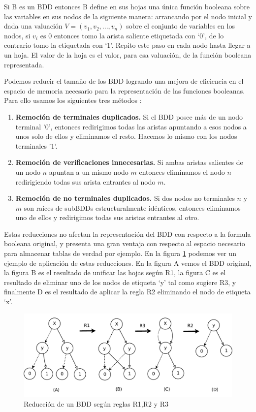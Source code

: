\documentclass[titlepage, 12pt]{book}
\begin{document}
Si B es un BDD entonces B define en sus hojas una \'unica funci\'on booleana sobre las variables en sus nodos de la siguiente manera: arrancando por el nodo inicial y dada una valuaci\'on $V=(v_1,v_2,...,v_n)$ sobre el conjunto de variables en los nodos, si $v_i$ es $0$ entonces tomo la arista saliente etiquetada con `0', de lo contrario tomo la etiquetada con `1'. Repito este paso en cada nodo hasta llegar a un hoja. El valor de la hoja es el valor, para esa valuaci\'on, de la funci\'on booleana representada.

Podemos reducir el tama\~no de los BDD logrando una mejora de eficiencia en el espacio de memoria necesario para la representaci\'on de las funciones booleanas. Para ello usamos los siguientes tres m\'etodos \cite{Huth}:
\begin{enumerate}[R1--]
\item \textbf{Remoci\'on de terminales duplicados.} Si el BDD posee m\'as de un nodo terminal '0', entonces redirigimos todas las aristas apuntando a esos nodos a unos solo de ellos y eliminamos el resto. Hacemos lo mismo con los nodos terminales '1'.
\item \textbf{Remoci\'on de verificaciones innecesarias.} Si ambas aristas salientes de un nodo $n$ apuntan a un mismo nodo $m$ entonces eliminamos el nodo $n$ redirigiendo todas sus arista entrantes al nodo $m$.
\item \textbf{Remoci\'on de no terminales duplicados.} Si dos nodos no terminales $n$ y $m$ son ra\'ices de subBDDs estructuralmente id\'enticos, entonces eliminamos uno de ellos y redirigimos todas sus aristas entrantes al otro.
\end{enumerate}
Estas reducciones no afectan la representaci\'on del BDD con respecto a la formula booleana original, y presenta una gran ventaja con respecto al espacio necesario para almacenar tablas de verdad por ejemplo. En la figura \ref{reduccionBDD} podemos ver un ejemplo de aplicaci\'on de estas reducciones. En la figura A vemos el BDD original, la figura B es el resultado de unificar las hojas seg\'un R1, la figura C es el resultado de eliminar uno de los nodos de etiqueta `y' tal como sugiere R3, y finalmente D es el resultado de aplicar la regla R2 eliminando el nodo de etiqueta `x'.

\begin{figure}[H]
  \centering
    \includegraphics[scale=0.75]{Imagenes/reduccionBDD.pdf}
  \caption{Reducci\'on de un BDD seg\'un reglas R1,R2 y R3}
  \label{reduccionBDD}
\end{figure}
~\\
\end{document}
